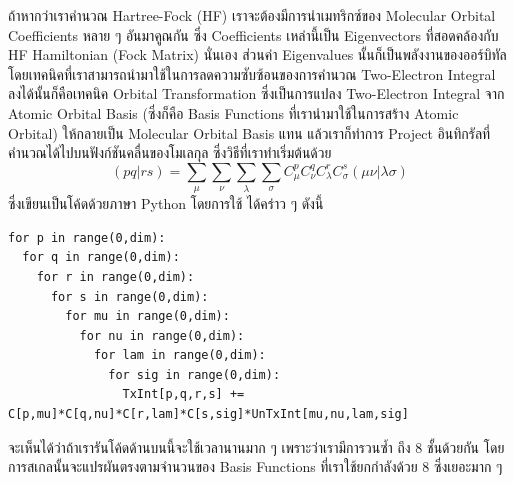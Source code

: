 ถ้าหากว่าเราคำนวณ Hartree-Fock (HF) เราจะต้องมีการนำเมทริกซ์ของ Molecular Orbital Coefficients หลาย ๆ อันมาคูณกัน ซึ่ง Coefficients เหล่านี้เป็น Eigenvectors ที่สอดคล้องกับ HF Hamiltonian (Fock Matrix) นั่นเอง ส่วนค่า Eigenvalues นั้นก็เป็นพลังงานของออร์บิทัล โดยเทคนิคที่เราสามารถนำมาใช้ในการลดความซับซ้อนของการคำนวณ Two-Electron Integral ลงได้นั้นก็คือเทคนิค Orbital Transformation ซึ่งเป็นการแปลง Two-Electron Integral จาก Atomic Orbital Basis (ซึ่งก็คือ Basis Functions ที่เรานำมาใช้ในการสร้าง Atomic Orbital) ให้กลายเป็น Molecular Orbital Basis แทน แล้วเราก็ทำการ Project อินทิกรัลที่คำนวณได้ไปบนฟังก์ชันคลื่นของโมเลกุล ซึ่งวิธีที่เราทำเริ่มต้นด้วย
%
\begin{equation}
  (pq\vert rs)
  =
  \sum_\mu \sum_\nu \sum_\lambda \sum_\sigma
  C^{p}_\mu C^{q}_\nu C^{r}_\lambda C^{s}_\sigma(\mu\nu\vert \lambda\sigma)
\end{equation}
%
ซึ่งเขียนเป็นโค้ดด้วยภาษา Python โดยการใช้  ได้คร่าว ๆ ดังนี้

\vspace{5pt}

\begin{lstlisting}[style=MyPython]
for p in range(0,dim):  
  for q in range(0,dim):  
    for r in range(0,dim):  
      for s in range(0,dim):  
        for mu in range(0,dim):  
          for nu in range(0,dim):  
            for lam in range(0,dim):  
              for sig in range(0,dim):  
                TxInt[p,q,r,s] += C[p,mu]*C[q,nu]*C[r,lam]*C[s,sig]*UnTxInt[mu,nu,lam,sig]
\end{lstlisting}

\vspace{5pt}

\noindent จะเห็นได้ว่าถ้าเรารันโค้ดด้านบนนี้จะใช้เวลานานมาก ๆ เพราะว่าเรามีการวนซ้ำ  ถึง 8 ชั้นด้วยกัน โดยการสเกลนั้นจะแปรผันตรงตามจำนวนของ Basis Functions ที่เราใช้ยกกำลังด้วย 8 ซึ่งเยอะมาก ๆ

